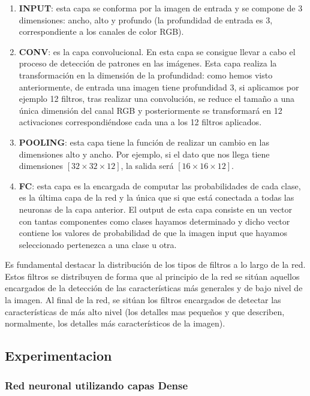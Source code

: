 \documentclass[11pt]{article} %
\begin{document}
\begin{enumerate}
	\item \textbf{INPUT}: esta capa se conforma por la imagen de entrada y se compone de 3 dimensiones: ancho, alto y profundo (la profundidad de entrada es 3, correspondiente a los canales de color RGB).
	\item \textbf{CONV}: es la capa convolucional. En esta capa se consigue llevar a cabo el proceso de detección de patrones en las imágenes. Esta capa realiza la transformación en la dimensión de la profundidad: como hemos visto anteriormente, de entrada una imagen tiene profundidad 3, si aplicamos por ejemplo 12 filtros, tras realizar una convolución, se reduce el tamaño a una única dimensión del canal RGB y posteriormente se transformará en 12 activaciones correspondiéndose cada una a los 12 filtros aplicados. 
	\item \textbf{POOLING}: esta capa tiene la función de realizar un cambio en las dimensiones alto y ancho. Por ejemplo, si el dato que nos llega tiene dimensiones $[32 \times 32 \times 12]$, la salida será $[16 \times 16 \times 12]$.
	\item \textbf{FC}: esta capa es la encargada de computar las probabilidades de cada
	clase, es la última capa de la red y la única que si que está conectada a todas las neuronas de	la capa anterior. El output de esta capa consiste en un vector con tantas componentes como clases hayamos determinado y dicho vector contiene los valores de probabilidad de que la imagen input que hayamos seleccionado pertenezca a una clase u otra.
\end{enumerate}

Es fundamental destacar la distribución de los tipos de filtros a lo largo de la red. Estos
filtros se distribuyen de forma que al principio de la red se sitúan aquellos encargados de la detección de las características más generales y de bajo nivel de la imagen. Al final de la red, se sitúan los filtros encargados de detectar las características de más alto nivel (los detalles mas pequeños y que describen, normalmente, los detalles más característicos de la imagen).



\subsection{Experimentacion}

\subsubsection{Red neuronal utilizando capas Dense}
\end{document}
